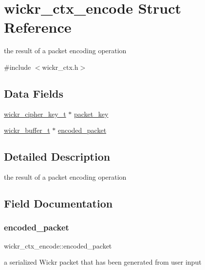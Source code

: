 \hypertarget{structwickr__ctx__encode}{}\section{wickr\+\_\+ctx\+\_\+encode Struct Reference}
\label{structwickr__ctx__encode}


the result of a packet encoding operation  




{\ttfamily \#include $<$wickr\+\_\+ctx.\+h$>$}

\subsection*{Data Fields}
\begin{DoxyCompactItemize}
\item 
\hyperlink{structwickr__cipher__key}{wickr\+\_\+cipher\+\_\+key\+\_\+t} $\ast$ \hyperlink{structwickr__ctx__encode_af96f392d9f5081e3c229d0342f71d629}{packet\+\_\+key}
\item 
\hyperlink{structwickr__buffer}{wickr\+\_\+buffer\+\_\+t} $\ast$ \hyperlink{structwickr__ctx__encode_ac83f0d28849ec047ccf8fb4b14319ad9}{encoded\+\_\+packet}
\end{DoxyCompactItemize}


\subsection{Detailed Description}
the result of a packet encoding operation 

\subsection{Field Documentation}
\mbox{\label{structwickr__ctx__encode_ac83f0d28849ec047ccf8fb4b14319ad9}} 
\subsubsection{\texorpdfstring{encoded\+\_\+packet}{encoded\_packet}}
{\footnotesize\ttfamily wickr\+\_\+ctx\+\_\+encode\+::encoded\+\_\+packet}

a serialized Wickr packet that has been generated from user input \mbox{\label{structwickr__ctx__encode_af96f392d9f5081e3c229d0342f71d629}} 
